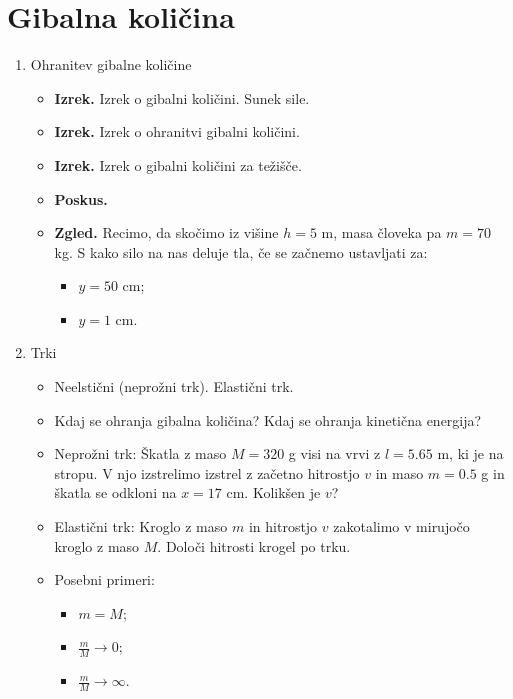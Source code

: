 \section{Gibalna količina}
\begin{enumerate}
    \item Ohranitev gibalne količine    
    \begin{itemize}
        \item \textbf{Izrek.} Izrek o gibalni količini. Sunek sile.
        \item \textbf{Izrek.} Izrek o ohranitvi gibalni količini.
        \item \textbf{Izrek.} Izrek o gibalni količini za težišče.
        \item \textbf{Poskus.} \todo{}
        \item \textbf{Zgled.} Recimo, da skočimo iz višine \(h = 5\) m, masa človeka pa \(m = 70\) kg. S kako silo na nas deluje tla, če se začnemo ustavljati za:
        \begin{itemize}
            \item \(y = 50\) cm;
            \item \(y = 1\) cm.
        \end{itemize}
    \end{itemize}

    \item Trki
    \begin{itemize}
        \item Neelstični (neprožni trk). Elastični trk.
        \item Kdaj se ohranja gibalna količina? Kdaj se ohranja kinetična energija?
        \item Neprožni trk: Škatla z maso \(M = 320\) g visi na vrvi z \(l = 5.65\) m, ki je na stropu. V njo izstrelimo izstrel z začetno hitrostjo \(v\) in maso \(m = 0.5\) g in škatla se odkloni na \(x = 17\) cm. Kolikšen je \(v\)?
        \item Elastični trk: Kroglo z maso \(m\) in hitrostjo \(v\) zakotalimo v mirujočo kroglo z maso \(M\). Določi hitrosti krogel po trku.
        \item Posebni primeri:
        \begin{itemize}
            \item \(m = M\);
            \item \(\frac{m}{M} \to 0\);
            \item \(\frac{m}{M} \to \infty\).
        \end{itemize}
    \end{itemize}


\end{enumerate}
